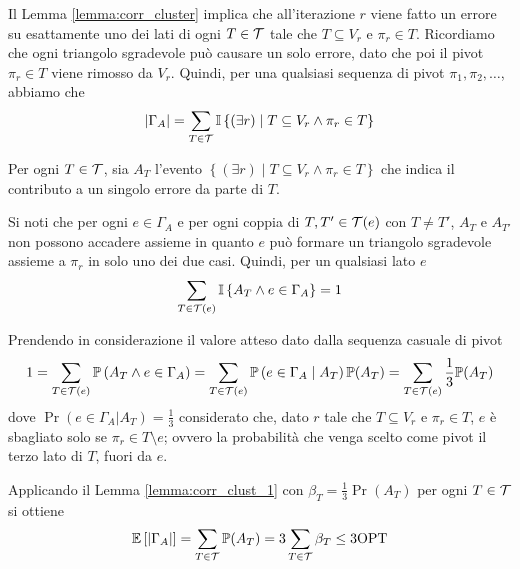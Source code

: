 Il Lemma \ref{lemma:corr_cluster} implica che all'iterazione $r$ viene fatto un errore su esattamente uno dei lati di ogni $T \in \mathcal{T}$ tale che $T \subseteq V_r$ e $\pi_r \in T$. Ricordiamo che ogni triangolo sgradevole può causare un solo errore, dato che poi il pivot $\pi_r \in T$ viene rimosso da $V_r$. Quindi, per una qualsiasi sequenza di pivot $\pi_1, \pi_2, \dots$, abbiamo che
$$ |\Gamma_A| = \sum_{T \in \mathcal{T}} \mathbb{I} \left\{(\exists r) \mid T \subseteq V_r \wedge \pi_r \in T \right\}$$

Per ogni $T \in \mathcal{T}$, sia $A_T$ l'evento $\left\{(\exists r) \mid T \subseteq V_r \wedge \pi_r \in T \right\}$ che indica il contributo a un singolo errore da parte di $T$.

Si noti che per ogni $e \in \Gamma_A$ e per ogni coppia di $T, T' \in \mathcal{T}(e)$ con $T \neq T'$, $A_T$ e $A_{T'}$ non possono accadere assieme in quanto $e$ può formare un triangolo sgradevole assieme a $\pi_r$ in solo uno dei due casi. Quindi, per un qualsiasi lato $e$
$$ \sum_{T \in \mathcal{T}(e)} \mathbb{I} \left\{A_T \wedge e \in \Gamma_A \right\} = 1$$

Prendendo in considerazione il valore atteso dato dalla sequenza casuale di pivot
$$ 1 = \sum_{T \in \mathcal{T}(e)} \mathbb{P} \left(A_T \wedge e \in \Gamma_A \right) = \sum_{T \in \mathcal{T}(e)} \mathbb{P} \left(e \in \Gamma_A \mid A_T\right) \mathbb{P} (A_T) = \sum_{T \in \mathcal{T}(e)} \frac{1}{3} \mathbb{P} (A_T) $$
dove $\Pr(e \in \Gamma_A | A_T) = \frac{1}{3}$ considerato che, dato $r$ tale che $T \subseteq V_r$ e $\pi_r \in T$, $e$ è sbagliato solo se $\pi_r \in T \setminus e$; ovvero la probabilità che venga scelto come pivot il terzo lato di $T$, fuori da $e$.

Applicando il Lemma \ref{lemma:corr_clust_1} con $\beta_T= \frac{1}{3} \Pr (A_T)$ per ogni $T \in \mathcal{T}$ si ottiene
$$ \mathbb{E} \left[|\Gamma_A|\right] = \sum_{T \in \mathcal{T}} \mathbb{P} (A_T) = 3 \sum_{T \in \mathcal{T}} \beta_T \leq 3 \textnormal{OPT} $$

